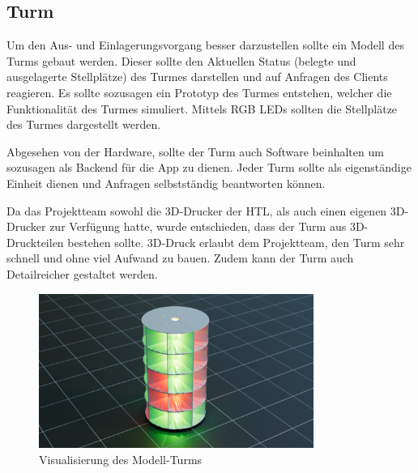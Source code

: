 \subsection{Turm}

Um den Aus- und Einlagerungsvorgang besser darzustellen sollte ein Modell des Turms gebaut werden. Dieser sollte den Aktuellen Status (belegte und ausgelagerte Stellplätze) des Turmes darstellen und auf Anfragen des Clients reagieren. Es sollte sozusagen ein Prototyp des Turmes entstehen, welcher die Funktionalität des Turmes simuliert. Mittels RGB LEDs sollten die Stellplätze des Turmes dargestellt werden.

Abgesehen von der Hardware, sollte der Turm auch Software beinhalten um sozusagen als Backend für die App zu dienen. Jeder Turm sollte als eigenständige Einheit dienen und Anfragen selbstständig beantworten können.

Da das Projektteam sowohl die 3D-Drucker der HTL, als auch einen eigenen 3D-Drucker zur Verfügung hatte, wurde entschieden, dass der Turm aus 3D-Druckteilen bestehen sollte. 3D-Druck erlaubt dem Projektteam, den Turm sehr schnell und ohne viel Aufwand zu bauen. Zudem kann der Turm auch Detailreicher gestaltet werden.

\begin{figure}[h]
  \centering
  \includegraphics[width=0.8\textwidth]{images/turm_modell.png}
  \caption{Visualisierung des Modell-Turms}
  \label{fig:turm}
\end{figure}